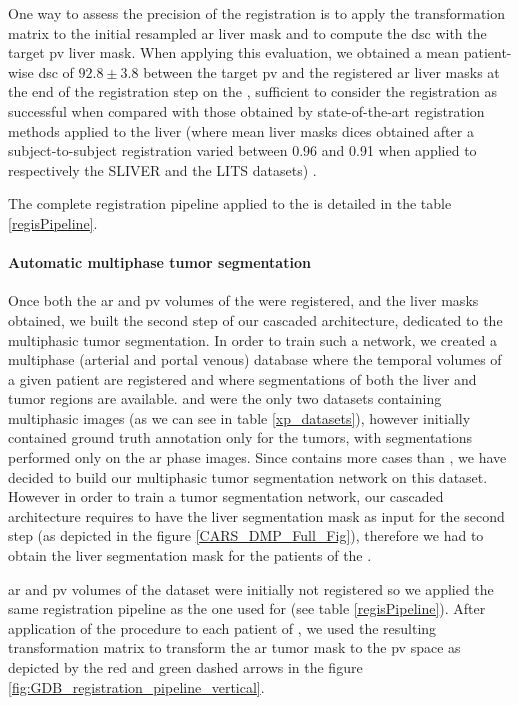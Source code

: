 One way to assess the precision of the registration is to apply the
transformation matrix to the initial resampled \ac{ar} liver mask and to
compute the \ac{dsc} with the target \ac{pv} liver mask. When applying this
evaluation, we obtained a mean patient-wise \ac{dsc} of $ 92.8 \pm 3.8 $ between the target \ac{pv} and the registered \ac{ar} liver masks at the
end of the registration step on the \textbf{}, sufficient to consider the
registration as successful when compared with those obtained by state-of-the-art
registration methods applied to the liver (where mean liver masks dices obtained after a subject-to-subject registration varied between 0.96 and 0.91 when applied to respectively the SLIVER and the LITS datasets) \cite{Zhao2019}.

The complete registration pipeline applied to the \textbf{} is detailed in the table \ref{regisPipeline}.

\paragraph{Automatic multiphase tumor segmentation}\label{tcia-db-unsupervised-multiphase-tumor-segmentation}

Once both the \ac{ar} and \ac{pv} volumes of the \textbf{} were registered, and the
liver masks obtained, we built the second step of our cascaded
architecture, dedicated to the multiphasic tumor segmentation. In order
to train such a network, we created a multiphase (arterial and portal
venous) database where the temporal volumes of a given patient are
registered and where segmentations of both the liver and tumor regions
are available.
\textbf{} and \textbf{} were the only two datasets containing multiphasic
images (as we can see in table \ref{xp_datasets}), however
\textbf{} initially contained ground truth annotation only for the tumors,
with segmentations performed only on the \ac{ar} phase images.
Since \textbf{} contains more cases than \textbf{}, we have decided to
build our multiphasic tumor segmentation network on this dataset.
However in order to train a tumor segmentation network, our cascaded
architecture requires to have the liver segmentation mask as input for
the second step (as depicted in the figure \ref{CARS_DMP_Full_Fig}), therefore we had to obtain the liver segmentation
mask for the patients of the \textbf{}.

\ac{ar} and \ac{pv} volumes of the \textbf{} dataset were initially not registered so
we applied the same registration pipeline as the one used for \textbf{} (see table \ref{regisPipeline}). After application of the procedure to
each patient of \textbf{}, we used the resulting transformation matrix to
transform the \ac{ar} tumor mask to the \ac{pv} space as depicted by the red and green dashed arrows in the figure \ref{fig:GDB_registration_pipeline_vertical}.


